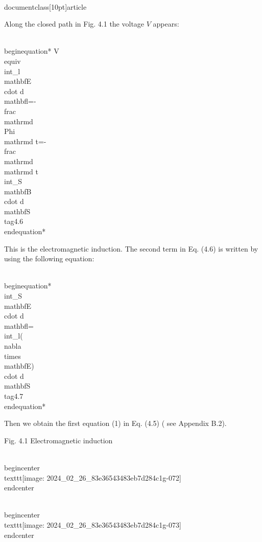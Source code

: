 \\documentclass[10pt]{article}
\begin{document}
Along the closed path in Fig. 4.1 the voltage $V$ appears:


\\begin{equation*}
V \\equiv \\int_{l} \\mathbf{E} \\cdot d \\mathbf{l}=-\\frac{\\mathrm{d} \\Phi}{\\mathrm{d} t}=-\\frac{\\mathrm{d}}{\\mathrm{d} t} \\int_{S} \\mathbf{B} \\cdot d \\mathbf{S} \\tag{4.6}
\\end{equation*}


This is the electromagnetic induction. The second term in Eq. (4.6) is written by using the following equation:


\\begin{equation*}
\\int_{S} \\mathbf{E} \\cdot d \\mathbf{l}=\\int_{l}(\\nabla \\times \\mathbf{E}) \\cdot d \\mathbf{S} \\tag{4.7}
\\end{equation*}


Then we obtain the first equation (1) in Eq. (4.5) ( see Appendix B.2).

Fig. 4.1 Electromagnetic induction

\\begin{center}
\\texttt{[image: 2024\_02\_26\_83e36543483eb7d284c1g-072]}
\\end{center}

\\begin{center}
\\texttt{[image: 2024\_02\_26\_83e36543483eb7d284c1g-073]}
\\end{center}
\end{document}
